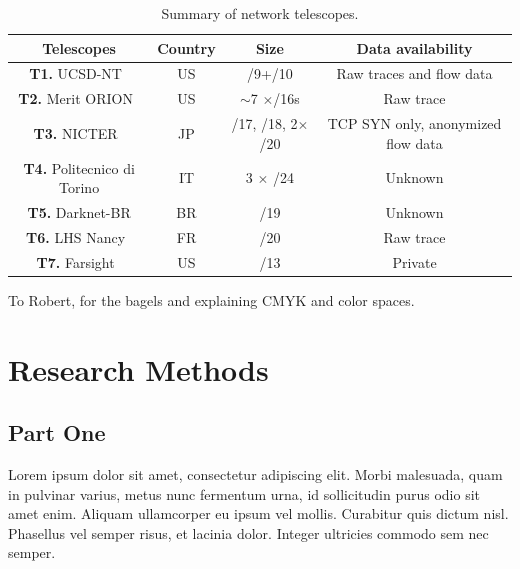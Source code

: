 \documentclass[manuscript,nonacm]{acmart}
\begin{document}
\begin{table}[httb]
	\small
	\caption{Summary of network telescopes.}\label{tab:telescopes}
	\begin{tabular}{cccc}
		\toprule
		Telescopes & Country & Size & Data availability\\
		\midrule
		\textbf{T1.} UCSD-NT~\cite{caida2025ucsdnt} & US & /9+/10 & Raw traces and flow data \\
		\textbf{T2.} Merit ORION~\cite{orion} & US & $\sim$7 $\times$/16s & Raw trace\\
		\textbf{T3.} NICTER~\cite{nicter2025nt} & JP &  /17, /18, 2$\times$/20 & TCP SYN only, anonymized flow data\\
		\textbf{T4.} Politecnico di Torino \cite{2020soro} & IT & 3 $\times$ /24 & Unknown\\
		\textbf{T5.} Darknet-BR \cite{CunhaCamargo2025darknetbr} & BR & /19 & Unknown\\
		\textbf{T6.} LHS Nancy~\cite{inria2025nt} & FR & /20 & Raw trace\\
		\textbf{T7.} Farsight~\cite{@@} & US & /13 & Private\\
		\bottomrule
	\end{tabular}
\end{table}

\begin{acks}
To Robert, for the bagels and explaining CMYK and color spaces.
\end{acks}




\appendix
\section{Research Methods}

\subsection{Part One}

Lorem ipsum dolor sit amet, consectetur adipiscing elit. Morbi
malesuada, quam in pulvinar varius, metus nunc fermentum urna, id
sollicitudin purus odio sit amet enim. Aliquam ullamcorper eu ipsum
vel mollis. Curabitur quis dictum nisl. Phasellus vel semper risus, et
lacinia dolor. Integer ultricies commodo sem nec semper.
\end{document}
